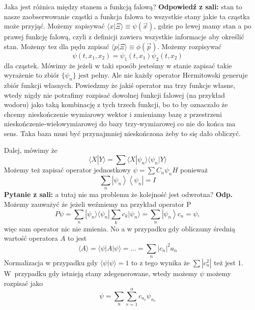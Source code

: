 Jaka jest różnica między stanem a funkcją falową? \textbf{Odpowiedź z sali:} stan to nasze zaobserwowanie cząstki a funkcja falowa to wszystkie stany jakie ta cząstka może przyjąć. Możemy zapisywać $\langle x | \Xi \rangle \equiv \psi (\vec{x})$, gdzie po lewej mamy stan a po prawej funkcję falową, czyli z definicji zawiera wszystkie informacje aby określić stan. Możemy tez dla pędu zapisać $\langle p | \Xi \rangle \equiv \phi (\vec{p})$. Możemy rozpisywać $$ \psi(t, x_1, x_2) = \psi_1(t, x_1) \psi_2(t, x_2) $$ dla cząstek.
Mówimy że jeżeli w taki sposób jesteśmy w stanie zapisać takie wyrażenie to zbiór $\{\psi_n\}$ jest pełny. Ale nie każdy operator Hermitowski generuje zbiór funkcji własnych. Powiedzmy że jakiś operator ma trzy funkcje własne, wtedy nigdy nie potrafimy rozpisać dowolnej funkcji falowej (na przykład wodoru) jako taką kombinację z tych trzech funkcji, bo to by oznaczało że chcemy nieskończenie wymiarowy wektor i zmieniamy bazę z przestrzeni nieskończenie-wielowymiarowej do bazy trzy-wymiarowej co nie do końca ma sens. Taka baza musi być przynajmniej nieskończona żeby to się dało obliczyć.

Dalej, mówimy że 
\begin{equation*}
	\langle X | Y \rangle = \sum \langle X | \psi_n \rangle \langle \psi_n | Y \rangle
\end{equation*}
Możemy też zapisać operator jednostkowy $ \psi=\sum C_{n} \psi_{n} H $ ponieważ
\begin{equation*}
	\sum_{n}\left|\psi_{n}\right\rangle\left\langle\psi_{n}\right|=I 
\end{equation*}
\textbf{Pytanie z sali:} a tutaj nie ma problemu że kolejność jest odwrotna? \textbf{Odp.} Możemy zauważyć że jeżeli weźmiemy na przykład operator P
\begin{equation*}
	P \psi=\sum_{n} |\psi_{n} \rangle \langle \psi_{n} | \sum_{k} c_{k} |\psi_{n} \rangle  =\sum_{n}\left|\psi_{n}\right\rangle c_{n}=\psi,
\end{equation*}
więc sam operator nic nie zmienia.
No a w przypadku gdy obliczamy średnią wartość operatora $A$ to jest 
\begin{equation*}
	\langle A\rangle=\langle\psi| A|\psi\rangle= \dotsc = \sum_{n}\left|c_{n}\right|^{2} a_{n}
\end{equation*}
Normalizacja w przypadku gdy $\langle \psi | \psi \rangle = 1$ to z tego wynika że $\sum |c_n^2|$ też jest $1$.
W~przypadku gdy istnieją stany zdegenerowane, wtedy możemy $\psi$ możemy rozpisać jako 
\begin{equation*}
	\psi = \sum_n \sum_{r=1}^{\alpha} c_{n_r} \psi_{n_r}
\end{equation*}

